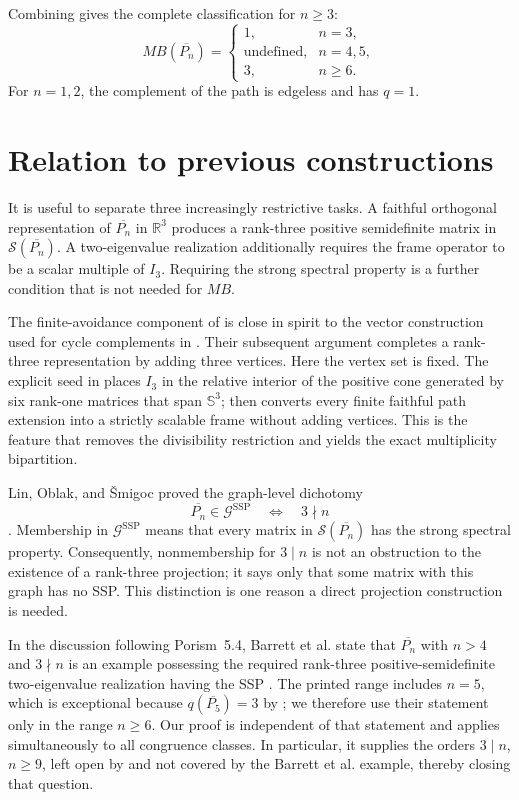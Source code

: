 \documentclass[11pt]{article}
\theoremstyle{remark}
\newcommand{\R}{\mathbb{R}}
\newcommand{\Sn}{\mathbb{S}}
\newcommand{\cS}{\mathcal{S}}
\begin{document}
Combining  gives the complete classification for
$n\ge3$:
\[
MB(\overline{P_n})=
\begin{cases}
1, & n=3,\\
\text{undefined}, & n=4,5,\\
3, & n\ge6.
\end{cases}
\tag{5.2}\label{eq:classification}
\]
For $n=1,2$, the complement of the path is edgeless and has $q=1$.

\section{Relation to previous constructions}

It is useful to separate three increasingly restrictive tasks.  A faithful
orthogonal representation of $\overline{P_n}$ in $\R^3$ produces a
rank-three positive semidefinite matrix in $\cS(\overline{P_n})$.  A
two-eigenvalue realization additionally requires the frame operator to be a
scalar multiple of $I_3$.  Requiring the strong spectral property is a
further condition that is not needed for $MB$.

The finite-avoidance component of  is close in spirit to
the vector construction used for cycle complements in
\cite[Lemma~5.2]{BarrettEtAl2026}.  Their subsequent argument completes a
rank-three representation by adding three vertices.  Here the vertex set is
fixed.  The explicit seed in  places $I_3$ in the relative
interior of the positive cone generated by six rank-one matrices that span
$\Sn^3$;  then converts every finite faithful path
extension into a strictly scalable frame without adding vertices.  This is
the feature that removes the divisibility restriction and yields the exact
multiplicity bipartition.

Lin, Oblak, and \v{S}migoc proved the graph-level dichotomy
\[
 \overline{P_n}\in\mathcal G^{\mathrm{SSP}}
 \quad\Longleftrightarrow\quad 3\nmid n
\]
\cite[Theorem~5.5]{LinOblakSmigoc2020}.  Membership in
$\mathcal G^{\mathrm{SSP}}$ means that every matrix in
$\cS(\overline{P_n})$ has the strong spectral property.  Consequently,
nonmembership for $3\mid n$ is not an obstruction to the existence of a
rank-three projection; it says only that some matrix with this graph has no
SSP.  This distinction is one reason a direct projection construction is
needed.

In the discussion following Porism~5.4, Barrett et al. state that
$\overline{P_n}$ with $n>4$ and $3\nmid n$ is an example possessing the
required rank-three positive-semidefinite two-eigenvalue realization having the SSP
\cite[p.~160]{BarrettEtAl2026}.  The printed range includes $n=5$, which is
exceptional because $q(\overline{P_5})=3$ by ; we therefore
use their statement only in the range $n\ge6$.  Our proof is independent of
that statement and applies simultaneously to all congruence classes.  In
particular, it supplies the orders $3\mid n$, $n\ge9$, left open by
\cite[Question~5.1]{AdmEtAl2019} and not covered by the Barrett et al.
example, thereby closing that question.
\end{document}
